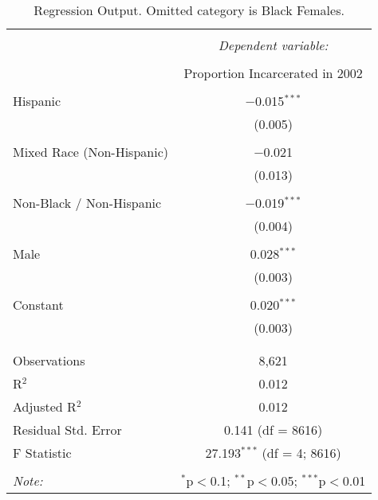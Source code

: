 
\begin{table}[!htbp] \centering 
  \caption{Regression Output. Omitted category is Black Females.} 
  \label{tab:regression} 
\begin{tabular}{@{\extracolsep{5pt}}lc} 
\\[-1.8ex]\hline 
\hline \\[-1.8ex] 
 & \multicolumn{1}{c}{\textit{Dependent variable:}} \\ 
\cline{2-2} 
\\[-1.8ex] & Proportion Incarcerated in 2002 \\ 
\hline \\[-1.8ex] 
 Hispanic & $-$0.015$^{***}$ \\ 
  & (0.005) \\ 
  & \\ 
 Mixed Race (Non-Hispanic) & $-$0.021 \\ 
  & (0.013) \\ 
  & \\ 
 Non-Black / Non-Hispanic & $-$0.019$^{***}$ \\ 
  & (0.004) \\ 
  & \\ 
 Male & 0.028$^{***}$ \\ 
  & (0.003) \\ 
  & \\ 
 Constant & 0.020$^{***}$ \\ 
  & (0.003) \\ 
  & \\ 
\hline \\[-1.8ex] 
Observations & 8,621 \\ 
R$^{2}$ & 0.012 \\ 
Adjusted R$^{2}$ & 0.012 \\ 
Residual Std. Error & 0.141 (df = 8616) \\ 
F Statistic & 27.193$^{***}$ (df = 4; 8616) \\ 
\hline 
\hline \\[-1.8ex] 
\textit{Note:}  & \multicolumn{1}{r}{$^{*}$p$<$0.1; $^{**}$p$<$0.05; $^{***}$p$<$0.01} \\ 
\end{tabular} 
\end{table} 
